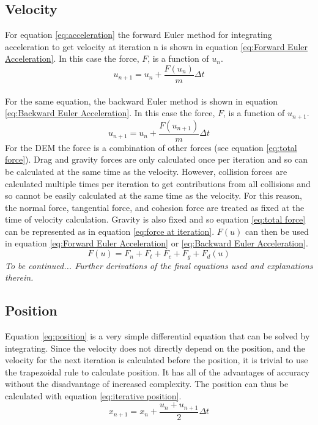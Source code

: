 \documentclass[10pt,a4paper,titlepage]{report}
\begin{document}
\subsection{Velocity}
For equation \ref{eq:acceleration} the forward Euler method for integrating acceleration to get velocity at iteration n is shown in equation \ref{eq:Forward Euler Acceleration}. In this case the force, $F$, is a function of $u_n$.
\begin{equation}
u_{n+1} = u_{n} + \dfrac{F(u_n)}{m}\Delta t
\label{eq:Forward Euler Acceleration}
\end{equation}
\\For the same equation, the backward Euler method is shown in equation \ref{eq:Backward Euler Acceleration}. In this case the force, $F$, is a function of $u_{n+1}$.
\begin{equation}
u_{n+1} = u_{n} + \dfrac{F(u_{n+1})}{m}\Delta t
\label{eq:Backward Euler Acceleration}
\end{equation}
For the DEM the force is a combination of other forces (see equation \ref{eq:total force}). Drag and gravity forces are only calculated once per iteration and so can be calculated at the same time as the velocity. However, collision forces are calculated multiple times per iteration to get contributions from all collisions and so cannot be easily calculated at the same time as the velocity. For this reason, the normal force, tangential force, and cohesion force are treated as fixed at the time of velocity calculation. Gravity is also fixed and so equation \ref{eq:total force} can be represented as in equation \ref{eq:force at iteration}. $F(u)$ can then be used in equation \ref{eq:Forward Euler Acceleration} or \ref{eq:Backward Euler Acceleration}.
\begin{equation}
F(u) = F_n + F_t + F_c + F_g + F_d(u)
\label{eq:force at iteration}
\end{equation}
\textit{To be continued... Further derivations of the final equations used and explanations therein.}
\subsection{Position}
Equation \ref{eq:position} is a very simple differential equation that can be solved by integrating. Since the velocity does not directly depend on the position, and the velocity for the next iteration is calculated before the position, it is trivial to use the trapezoidal rule to calculate position. It has all of the advantages of accuracy without the disadvantage of increased complexity. The position can thus be calculated with equation \ref{eq:iterative position}.
\begin{equation}
x_{n+1} = x_n + \dfrac{u_n + u_{n+1}}{2}\Delta t
\label{eq:iterative position}
\end{equation}
\end{document}
